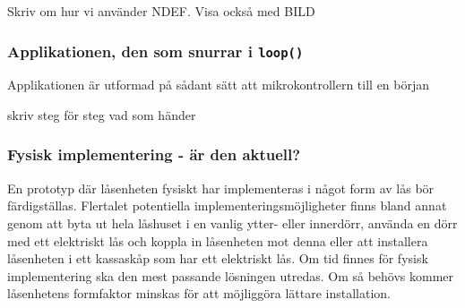 \documentclass[11pt]{article}
\begin{document}
Skriv om hur vi använder NDEF. Visa också med BILD

\subsubsection{Applikationen, den som snurrar i \texttt{loop()}}
Applikationen är utformad på sådant sätt att mikrokontrollern till en början 

skriv steg för steg vad som händer

\subsubsection{Fysisk implementering - är den aktuell?}
En prototyp där låsenheten fysiskt har implementeras i något form av lås bör färdigställas. Flertalet potentiella implementeringsmöjligheter finns bland annat genom att byta ut hela låshuset i en vanlig ytter- eller innerdörr,  använda en dörr med ett elektriskt lås och koppla in låsenheten mot denna eller att installera låsenheten i ett kassaskåp som har ett elektriskt lås. Om tid finnes för fysisk implementering ska den mest passande lösningen utredas. Om så behövs kommer låsenhetens formfaktor minskas för att möjliggöra lättare installation.
\end{document}
